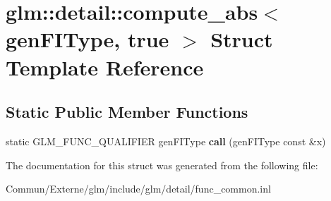 \hypertarget{structglm_1_1detail_1_1compute__abs_3_01gen_f_i_type_00_01true_01_4}{}\section{glm\+:\+:detail\+:\+:compute\+\_\+abs$<$ gen\+F\+I\+Type, true $>$ Struct Template Reference}
\label{structglm_1_1detail_1_1compute__abs_3_01gen_f_i_type_00_01true_01_4}
\subsection*{Static Public Member Functions}
\begin{DoxyCompactItemize}
\item 
static G\+L\+M\+\_\+\+F\+U\+N\+C\+\_\+\+Q\+U\+A\+L\+I\+F\+I\+ER gen\+F\+I\+Type {\bfseries call} (gen\+F\+I\+Type const \&x)\hypertarget{structglm_1_1detail_1_1compute__abs_3_01gen_f_i_type_00_01true_01_4_a13dee7b421d52969e40d8cdef020d0be}{}\label{structglm_1_1detail_1_1compute__abs_3_01gen_f_i_type_00_01true_01_4_a13dee7b421d52969e40d8cdef020d0be}

\end{DoxyCompactItemize}


The documentation for this struct was generated from the following file\+:\begin{DoxyCompactItemize}
\item 
Commun/\+Externe/glm/include/glm/detail/func\+\_\+common.\+inl\end{DoxyCompactItemize}
